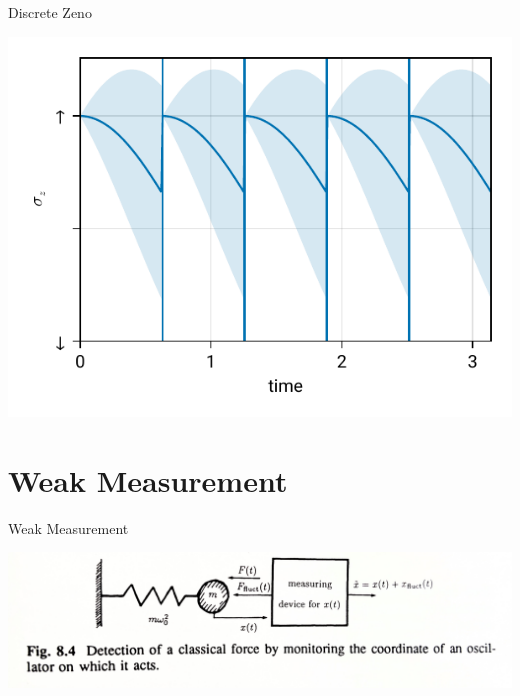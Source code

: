 \documentclass[handout]{beamer}
\begin{document}
\begin{frame}{Discrete Zeno}
	\begin{center}
		\includegraphics{figures/04 discreate zeno.pdf}
	\end{center}
\end{frame}


\section{Weak Measurement}
\begin{frame}{Weak Measurement}
	\begin{center}
		\includegraphics[width=\textwidth]{figures/Fig. 8.4.jpg}
	\end{center}
\end{frame}
\end{document}

